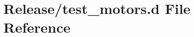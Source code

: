 \hypertarget{test__motors_8d}{}\section{Release/test\+\_\+motors.d File Reference}
\label{test__motors_8d}

